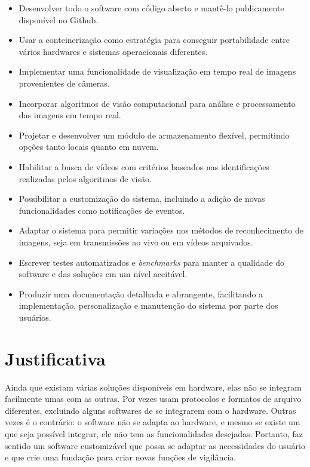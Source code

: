 \documentclass[12pt, %
openright, 
oneside, %
a4paper,    %
brazil]{facom-ufu-abntex2}
\begin{document}
\begin{itemize}
	\item Desenvolver todo o software com código aberto e mantê-lo publicamente
	      disponível no Github.
	\item Usar a conteinerização como estratégia para conseguir portabilidade entre
	      vários hardwares e sistemas operacionais diferentes.
	\item Implementar uma funcionalidade de visualização em tempo real de imagens
	      provenientes de câmeras.
	\item Incorporar algoritmos de visão computacional para análise e processamento das
	      imagens em tempo real.
	\item Projetar e desenvolver um módulo de armazenamento flexível, permitindo opções
	      tanto locais quanto em nuvem.
	\item Habilitar a busca de vídeos com critérios baseados nas identificações
	      realizadas pelos algoritmos de visão.
	\item Possibilitar a customização do sistema, incluindo a adição de novas
	      funcionalidades como notificações de eventos.
	\item Adaptar o sistema para permitir variações nos métodos de reconhecimento de
	      imagens, seja em transmissões ao vivo ou em vídeos arquivados.
	\item Escrever testes automatizados e \textit{\foreignlanguage{english}{benchmarks}}
	      para manter a qualidade do software e das soluções em um nível aceitável.
	\item Produzir uma documentação detalhada e abrangente, facilitando a implementação,
	      personalização e manutenção do sistema por parte dos usuários.
\end{itemize}

\section{Justificativa}

Ainda que existam várias soluções disponíveis em hardware, elas não se integram
facilmente umas com as outras. Por vezes usam protocolos e formatos de arquivo
diferentes, excluindo alguns softwares de se integrarem com o hardware. Outras
vezes é o contrário: o software não se adapta ao hardware, e mesmo se existe um
que seja possível integrar, ele não tem as funcionalidades desejadas. Portanto,
faz sentido um software customizável que possa se adaptar as necessidades do
usuário e que crie uma fundação para criar novas funções de vigilância.
\end{document}
